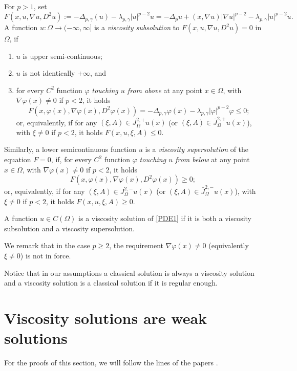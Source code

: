 \documentclass[12pt]{amsart}
\newcommand{\1}{\mathbf 1}
\begin{document}
For $p>1$, set
\begin{equation}
F(x,u,\nabla u, D^2 u):=-\Delta_{p,\gamma}(u)-\lambda_{p,\gamma} |u|^{p-2}u=-\Delta_p u+(x,\nabla u)|\nabla u|^{p-2}-\lambda_{p,\gamma} |u|^{p-2}u.
\end{equation}
A function $u:\Omega \rightarrow (-\infty,\infty]$ is a {\it viscosity subsolution} to $F(x,u,\nabla u, D^2 u)=0$ in $\Omega$, if
\begin{enumerate}
  \item $u$ is upper semi-continuous;
  \item $u$ is not identically $+\infty$, and
  \item for every $C^2$ function $\varphi$ {\it{touching $u$ from above}} at any point $x\in \Omega$, with $\nabla \varphi (x)\neq 0$ if $p<2$, it holds
  \[
   F(x,\varphi(x),\nabla\varphi(x),D^2 \varphi(x))=-\Delta_{p,\gamma} \varphi(x)-\lambda_{p,\gamma} |\varphi|^{p-2}\varphi\leq 0;
   \]
or, equivalently, if for any $(\xi,A)\in {J}^{2,+}_\Omega u (x)$ (or $(\xi,A)\in \bar{J}^{2,+}_\Omega u (x)$), with $\xi\neq 0$ if $p<2$, it holds $F(x,u,\xi,A)\leq 0$.
\end{enumerate}

Similarly, a lower semicontinuous function $u$ is a {\it viscosity supersolution} of the equation $F=0$, if, for every $C^2$ function $\varphi$ {\it{touching $u$ from below}} at any point $x\in \Omega$, with $\nabla \varphi(x)\neq 0$ if $p<2$, it holds
\[
F(x,\varphi(x),\nabla\varphi(x),D^2 \varphi(x))\geq 0;
\]
or, equivalently, if for any $(\xi,A)\in {J}^{2,-}_\Omega u (x)$ (or $(\xi,A)\in \bar{J}^{2,-}_\Omega u (x)$), with $\xi\neq 0$ if $p<2$, it holds $F(x,u,\xi,A)\geq 0$.

A function $u\in C(\Omega)$ is a viscosity solution of \eqref{PDE1} if it is both a viscosity subsolution and a viscosity supersolution.

 We remark that in the case $p\geq2$, the requirement $\nabla \varphi(x) \neq 0$ (equivalently $\xi\neq 0$) is not in force.

Notice that in our assumptions a classical solution is always a viscosity solution and a viscosity solution is a classical solution if it is regular enough.



\section{Viscosity solutions are weak solutions }\label{Se3}

For the proofs of this section, we will follow the lines of the papers \cite{Radulescu2024, Versa-Julin2012, Juutinen2001, MO, Siltakoski2018}.
\end{document}

